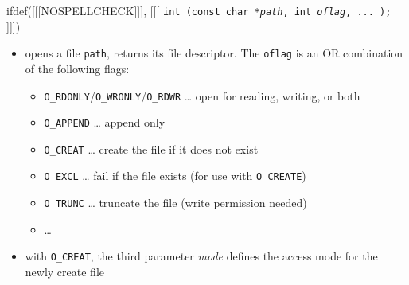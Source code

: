 

\begin{slide}
ifdef([[[NOSPELLCHECK]]], [[[
\texttt{int (const char *\emph{path}, int \emph{oflag},
... );}
]]])
\begin{itemize}
\item opens a file \texttt{path}, returns its file descriptor. The
\texttt{oflag} is an OR combination of the following flags:
    \begin{itemize}
    \item \texttt{O\_RDONLY}/\texttt{O\_WRONLY}/\texttt{O\_RDWR} \dots{}
    open for reading, writing, or both
    \item \texttt{O\_APPEND} \dots{} append only
    \item \texttt{O\_CREAT} \dots{} create the file if it does not exist
    \item \texttt{O\_EXCL} \dots{} fail if the file exists (for use with
    \texttt{O\_CREATE})
    \item \texttt{O\_TRUNC} \dots{} truncate the file (write permission
    needed)
    \item \dots{}
    \end{itemize}
\item with \texttt{O\_CREAT}, the third parameter \emph{mode}
defines the access mode for the newly create file
\end{itemize}
\end{slide}

\label{OPEN}


